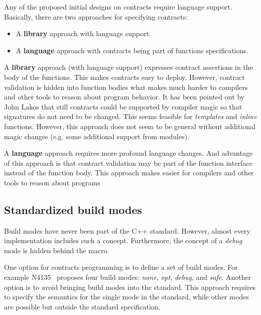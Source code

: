 Any of the proposed initial designs on contracts require language support.
Basically, there are two approaches for specifying contracts:

\begin{itemize}
\item A \textbf{library} approach with language support.
\item A \textbf{language} approach with contracts being part of functions
specifications.
\end{itemize}

A \textbf{library} approach (with language support) expresses contract
assertions in the body of the functions. This makes contracts easy to deploy.
However, contract validation is hidden into function bodies what makes much
harder to compilers and other tools to reason about program behavior. It has been
pointed out by John Lakos that still contracts could be supported by compiler magic
so that signatures do not need to be changed. This seems feasible for \emph{templates}
and \emph{inline} functions. However, this approach does not seem to be general
without additional magic changes (e.g. some additional support from modules).	

A \textbf{language} approach requires more profound language changes. And
advantage of this approach is that contract validation may be part of the
function interface instead of the function body. This approach makes easier for
compilers and other tools to reason about programs


\subsection{Standardized build modes}

Build modes have never been part of the C++ standard. However, almost every
implementation includes such a concept. Furthermore, the concept of a
\emph{debug} mode is hidden behind the  macro.

One option for contracts programming is to define a set of build modes. For
example N4135~\cite{n4135} proposes four build modes: \emph{none}, \emph{opt},
\emph{debug}, and \emph{safe}. Another option is to avoid bringing build modes
into the standard. This approach requires to specify the semantics for the
single mode in the standard, while other modes are possible but outside the
standard specification.

